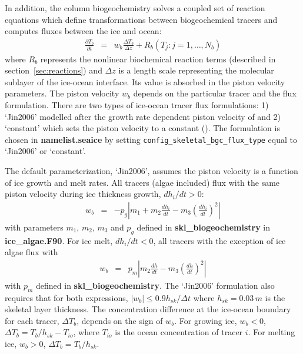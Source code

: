 In addition, the column biogeochemistry solves a coupled set of reaction equations which define transformations between biogeochemical tracers and computes fluxes between the ice and ocean:
\begin{eqnarray}
\label{eqn:bgc_Tracer}
\frac{\partial T_b}{\partial t}  & = & w_b \frac{\Delta T_b}{\Delta z} +  R_b({T_j : j = 1,\ldots,N_b})
\end{eqnarray}
where $R_b$ represents the nonlinear biochemical reaction terms
(described in section~\ref{sec:reactions})
 and $\Delta z$ is a length scale
representing the molecular sublayer of the ice-ocean interface.  Its
value is absorbed in the piston velocity parameters.  The piston
velocity $w_b$  depends
on the particular tracer and the flux formulation.  There are two types of ice-ocean tracer flux formulations: 1)
`Jin2006' modelled after the growth rate dependent piston velocity of \cite{Jin:sklbgc:2006}
and 2) `constant' which sets the piston velocity to a constant (\cite{Elliott:sklbgc:2012}).
The formulation is chosen in  {\bf namelist.seaice} by setting {\tt config\_skeletal\_bgc\_flux\_type} equal to
`Jin2006' or `constant'.

The default parameterization,  `Jin2006', assumes the piston velocity is a function of ice growth and melt rates.  All tracers (algae included) flux with the same piston velocity during ice thickness growth,
 $dh_i/dt > 0$:
\begin{eqnarray}
\label{eqn:pwJin_growth}
w_b  & =  & - p_g\left|m_1 + m_2 \frac{dh_i}{dt} - m_3
  \left(\frac{dh_i}{dt} \right)^2\right|
\end{eqnarray}
with parameters $m_1$, $m_2$, $m_3$ and $p_g$ defined
in {\bf skl\_biogeochemistry} in {\bf ice\_algae.F90}.
For ice melt, $dh_i/dt < 0$, all tracers with the exception of ice algae
flux with
\begin{eqnarray}
\label{eqn:pwJin_melt}
w_b  & =  & p_m\left|m_2 \frac{dh}{dt} - m_3
    \left(\frac{dh}{dt}  \right)^2\right|
\end{eqnarray}
with $p_m$ defined
in {\bf skl\_biogeochemistry}.
The `Jin2006' formulation also requires that for both expressions, $|w_b| \leq 0.9
h_{sk}/\Delta t$ where $h_{sk}=0.03\,m$ is the skeletal layer thickness.
The concentration difference at the ice-ocean boundary for each tracer, $\Delta
T_b$, depends on the sign of $w_b$.  For growing ice, $w_b < 0$,
$\Delta T_b  = T_b/h_{sk} - T_{io}$, where $T_{io}$ is the ocean
concentration of tracer $i$. For melting
ice,  $w_b > 0$, $\Delta T_b = T_b/h_{sk}$.

